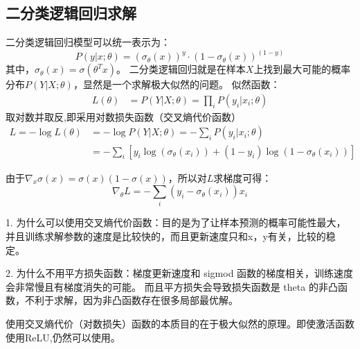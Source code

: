 \subsection{二分类逻辑回归求解}
二分类逻辑回归模型可以统一表示为：
\begin{equation*}
    P(y|x;\theta) = (\sigma_\theta(x))^y \cdot (1-\sigma_\theta(x))^{(1-y)}
\end{equation*}
其中，$\sigma_\theta(x) = \sigma(\theta^T x)$。
二分类逻辑回归就是在样本$X$上找到最大可能的概率分布$P(Y|X;\theta)$，显然是一个求解极大似然的问题。
似然函数：
\begin{align*}
    L(\theta) &= P(Y|X;\theta) = \prod_i P(y_i|x_i;\theta) 
\end{align*}
取对数并取反,即采用对数损失函数（交叉熵代价函数）
\begin{align*}
    L = -\log L(\theta) &= -\log P(Y|X;\theta) = -\sum_i P(y_i|x_i;\theta) \\ 
    &= - \sum_i \left[ y_i \log (\sigma_\theta(x_i)) + (1-y_i) \log (1-\sigma_\theta(x_i))\right]
\end{align*}

由于$\nabla_x \sigma(x) = \sigma(x)(1-\sigma(x))$，所以对$L$求梯度可得：
\begin{equation*}
    \nabla_\theta L = -\sum_i (y_i - \sigma_\theta(x_i))x_i
\end{equation*}

{}

1. 为什么可以使用交叉熵代价函数：目的是为了让样本预测的概率可能性最大，
并且训练求解参数的速度是比较快的，而且更新速度只和x，y有关，比较的稳定。

2. 为什么不用平方损失函数：梯度更新速度和 sigmod 函数的梯度相关，训练速度会非常慢且有梯度消失的可能。
而且平方损失会导致损失函数是 theta 的非凸函数，不利于求解，因为非凸函数存在很多局部最优解。

使用交叉熵代价（对数损失）函数的本质目的在于极大似然的原理。即使激活函数使用ReLU,仍然可以使用。

